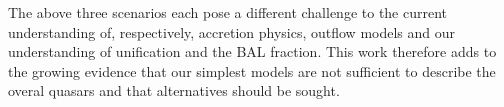 The above three scenarios each pose a different challenge to the current
understanding of, respectively, accretion physics, outflow models
and our understanding of unification and the BAL fraction. 
This work therefore adds to the growing evidence that our simplest models are not sufficient to
describe the overal quasars and that alternatives should be sought.


